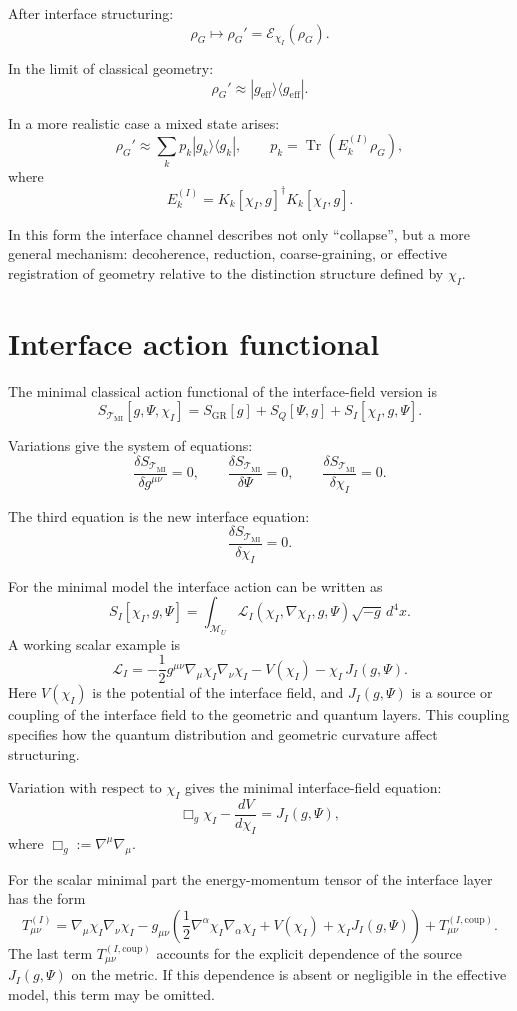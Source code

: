 \documentclass[12pt,a4paper]{article}
\DeclareMathOperator{\Tr}{Tr}
\newcommand{\TMI}{\mathcal T_{\mathrm{MI}}}
\newcommand{\M}{\mathcal M_U}
\newcommand{\Eff}{\mathrm{eff}}
\newcommand{\Lag}{\mathcal L}
\begin{document}
After interface structuring:
\[
\boxed{
\rho_G\longmapsto \rho_G'=
\mathcal E_{\chi_I}(\rho_G).
}
\]

In the limit of classical geometry:
\[
\boxed{
\rho_G'
\approx
|g_{\Eff}\rangle\langle g_{\Eff}|.
}
\]

In a more realistic case a mixed state arises:
\[
\boxed{
\rho_G'
\approx
\sum_k p_k |g_k\rangle\langle g_k|,
\qquad
p_k=\Tr(E_k^{(I)}\rho_G),
}
\]
where
\[
E_k^{(I)}=K_k[\chi_I,g]^{\dagger}K_k[\chi_I,g].
\]

In this form the interface channel describes not only ``collapse'', but a more general mechanism: decoherence, reduction, coarse-graining, or effective registration of geometry relative to the distinction structure defined by $\chi_I$.

\section{Interface action functional}

The minimal classical action functional of the interface-field version is
\[
\boxed{
S_{\TMI}[g,\Psi,\chi_I]
=
S_{\mathrm{GR}}[g]
+
S_Q[\Psi,g]
+
S_I[\chi_I,g,\Psi].
}
\]

Variations give the system of equations:
\[
\boxed{
\frac{\delta S_{\TMI}}{\delta g^{\mu\nu}}=0,
\qquad
\frac{\delta S_{\TMI}}{\delta \Psi}=0,
\qquad
\frac{\delta S_{\TMI}}{\delta \chi_I}=0.
}
\]

The third equation is the new interface equation:
\[
\boxed{
\frac{\delta S_{\TMI}}{\delta \chi_I}=0.
}
\]

For the minimal model the interface action can be written as
\[
\boxed{
S_I[\chi_I,g,\Psi]
=
\int_{\M}
\Lag_I(\chi_I,\nabla\chi_I,g,\Psi)\sqrt{-g}\,d^4x.
}
\]
A working scalar example is
\[
\boxed{
\Lag_I
=
-\frac{1}{2}g^{\mu\nu}\nabla_\mu\chi_I\nabla_\nu\chi_I
-
V(\chi_I)
-
\chi_I\,J_I(g,\Psi).
}
\]
Here $V(\chi_I)$ is the potential of the interface field, and $J_I(g,\Psi)$ is a source or coupling of the interface field to the geometric and quantum layers. This coupling specifies how the quantum distribution and geometric curvature affect structuring.

Variation with respect to $\chi_I$ gives the minimal interface-field equation:
\[
\boxed{
\Box_g\chi_I
-
\frac{dV}{d\chi_I}
=
J_I(g,\Psi),
}
\]
where $\Box_g:=\nabla^\mu\nabla_\mu$.

For the scalar minimal part the energy-momentum tensor of the interface layer has the form
\[
\boxed{
T_{\mu\nu}^{(I)}
=
\nabla_\mu\chi_I\nabla_\nu\chi_I
-
g_{\mu\nu}
\left(
\frac{1}{2}\nabla^\alpha\chi_I\nabla_\alpha\chi_I
+
V(\chi_I)
+
\chi_I J_I(g,\Psi)
\right)
+
T_{\mu\nu}^{(I,\mathrm{coup})}.
}
\]
The last term $T_{\mu\nu}^{(I,\mathrm{coup})}$ accounts for the explicit dependence of the source $J_I(g,\Psi)$ on the metric. If this dependence is absent or negligible in the effective model, this term may be omitted.
\end{document}

